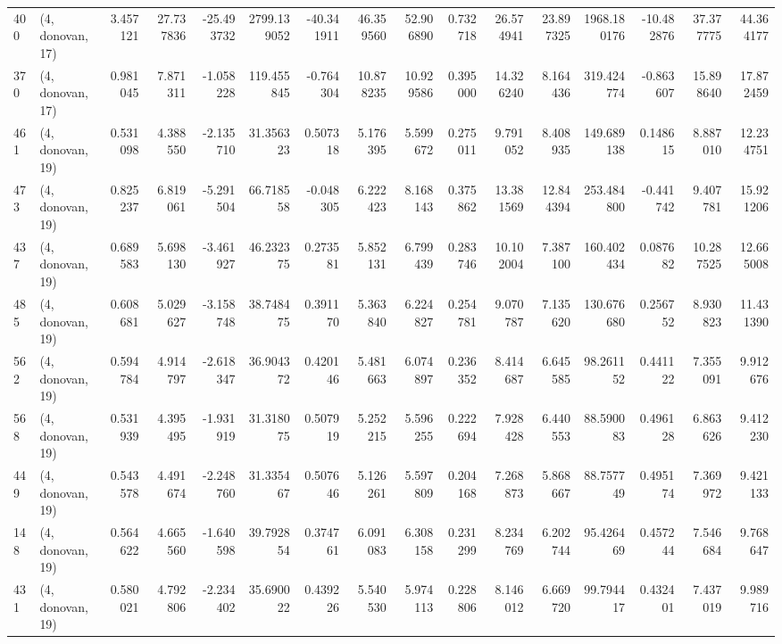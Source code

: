 \begin{tabular}{llrrrrrrrrrrrrrr}
400 &  (4, donovan, 17) &   3.457121 &  27.737836 & -25.493732 &  2799.139052 & -40.341911 &  46.359560 &  52.906890 &  0.732718 &  26.574941 &  23.897325 &   1968.180176 & -10.482876 &  37.377775 &   44.364177 \\
370 &  (4, donovan, 17) &   0.981045 &   7.871311 &  -1.058228 &   119.455845 &  -0.764304 &  10.878235 &  10.929586 &  0.395000 &  14.326240 &   8.164436 &    319.424774 &  -0.863607 &  15.898640 &   17.872459 \\
461 &  (4, donovan, 19) &   0.531098 &   4.388550 &  -2.135710 &    31.356323 &   0.507318 &   5.176395 &   5.599672 &  0.275011 &   9.791052 &   8.408935 &    149.689138 &   0.148615 &   8.887010 &   12.234751 \\
473 &  (4, donovan, 19) &   0.825237 &   6.819061 &  -5.291504 &    66.718558 &  -0.048305 &   6.222423 &   8.168143 &  0.375862 &  13.381569 &  12.844394 &    253.484800 &  -0.441742 &   9.407781 &   15.921206 \\
437 &  (4, donovan, 19) &   0.689583 &   5.698130 &  -3.461927 &    46.232375 &   0.273581 &   5.852131 &   6.799439 &  0.283746 &  10.102004 &   7.387100 &    160.402434 &   0.087682 &  10.287525 &   12.665008 \\
485 &  (4, donovan, 19) &   0.608681 &   5.029627 &  -3.158748 &    38.748475 &   0.391170 &   5.363840 &   6.224827 &  0.254781 &   9.070787 &   7.135620 &    130.676680 &   0.256752 &   8.930823 &   11.431390 \\
562 &  (4, donovan, 19) &   0.594784 &   4.914797 &  -2.618347 &    36.904372 &   0.420146 &   5.481663 &   6.074897 &  0.236352 &   8.414687 &   6.645585 &     98.261152 &   0.441122 &   7.355091 &    9.912676 \\
568 &  (4, donovan, 19) &   0.531939 &   4.395495 &  -1.931919 &    31.318075 &   0.507919 &   5.252215 &   5.596255 &  0.222694 &   7.928428 &   6.440553 &     88.590083 &   0.496128 &   6.863626 &    9.412230 \\
449 &  (4, donovan, 19) &   0.543578 &   4.491674 &  -2.248760 &    31.335467 &   0.507646 &   5.126261 &   5.597809 &  0.204168 &   7.268873 &   5.868667 &     88.757749 &   0.495174 &   7.369972 &    9.421133 \\
148 &  (4, donovan, 19) &   0.564622 &   4.665560 &  -1.640598 &    39.792854 &   0.374761 &   6.091083 &   6.308158 &  0.231299 &   8.234769 &   6.202744 &     95.426469 &   0.457244 &   7.546684 &    9.768647 \\
431 &  (4, donovan, 19) &   0.580021 &   4.792806 &  -2.234402 &    35.690022 &   0.439226 &   5.540530 &   5.974113 &  0.228806 &   8.146012 &   6.669720 &     99.794417 &   0.432401 &   7.437019 &    9.989716 \\

\end{tabular}
